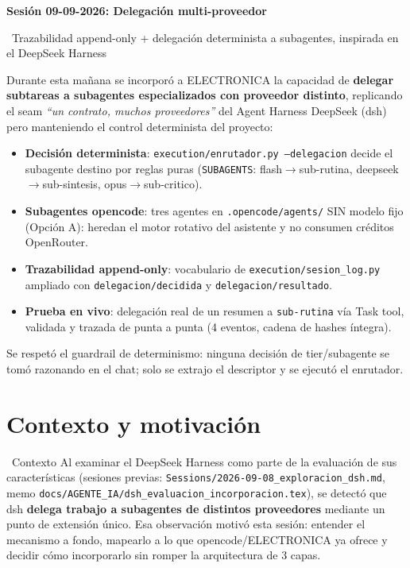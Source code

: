 \documentclass[11pt,a4paper]{article}
\newcommand{\iconoBanda}{microchip}
\newcommand{\bandaTitulo}[3][fondoOscuro]{%
  \begin{tcolorbox}[
    enhanced,
    colback=#1, colframe=#1,
    boxrule=0pt, arc=8pt, outer arc=8pt,
    width=\linewidth,
    top=18pt, bottom=6pt, left=14pt, right=14pt,
    borderline south={3.5pt}{0pt}{cyanNeon},
  ]
    \begin{minipage}[c]{0.07\linewidth}
      \centering
      \textcolor{cyanNeon}{\fontsize{30}{30}\selectfont\faIcon{\iconoBanda}}
    \end{minipage}%
    \hspace{8pt}%
    \begin{minipage}[c]{0.88\linewidth}
      {\fontsize{20}{24}\selectfont\bfseries\color{white}#2}\par\vspace{5pt}%
      \textcolor{cyanNeon!80!white}{\small\faIcon{angle-right}~#3}%
    \end{minipage}
    \vspace{4pt}
  \end{tcolorbox}%
  \vspace{8pt}%
}
\newcommand{\iconotexto}[2]{\textcolor{cyanNeon}{\faIcon{#1}}~#2}
\begin{document}
\bandaTitulo[fondoOscuro]{Sesión 09-09-2026: Delegación multi-proveedor}{Trazabilidad append-only + delegación determinista a subagentes, inspirada en el DeepSeek Harness}

\begin{tcolorbox}[tarjetaDato, title={\faIcon{clipboard-list}~Resumen ejecutivo}]
Durante esta mañana se incorporó a ELECTRONICA la capacidad de \textbf{delegar
subtareas a subagentes especializados con proveedor distinto}, replicando el seam
\emph{``un contrato, muchos proveedores''} del Agent Harness DeepSeek (dsh) pero
manteniendo el control determinista del proyecto:
\begin{itemize}[leftmargin=16pt, itemsep=2pt, topsep=2pt]
  \item \textbf{Decisión determinista}: \texttt{execution/enrutador.py --delegacion} decide el subagente destino por reglas puras (\texttt{SUBAGENTS}: flash$\rightarrow$sub-rutina, deepseek$\rightarrow$sub-sintesis, opus$\rightarrow$sub-critico).
  \item \textbf{Subagentes opencode}: tres agentes en \texttt{.opencode/agents/} SIN modelo fijo
        (Opción A): heredan el motor rotativo del asistente y no consumen créditos OpenRouter.
  \item \textbf{Trazabilidad append-only}: vocabulario de \texttt{execution/sesion\_log.py}
        ampliado con \texttt{delegacion/decidida} y \texttt{delegacion/resultado}.
  \item \textbf{Prueba en vivo}: delegación real de un resumen a \texttt{sub-rutina} vía Task
        tool, validada y trazada de punta a punta (4 eventos, cadena de hashes íntegra).
\end{itemize}
Se respetó el guardrail de determinismo: ninguna decisión de tier/subagente se tomó
razonando en el chat; solo se extrajo el descriptor y se ejecutó el enrutador.
\end{tcolorbox}

\section{Contexto y motivación}

\iconotexto{eye}{Contexto} Al examinar el DeepSeek Harness como parte de la evaluación
de sus características (sesiones previas: \texttt{Sessions/2026-09-08\_exploracion\_dsh.md},
memo \texttt{docs/AGENTE\_IA/dsh\_evaluacion\_incorporacion.tex}), se detectó que dsh
\textbf{delega trabajo a subagentes de distintos proveedores} mediante un punto de
extensión único. Esa observación motivó esta sesión: entender el mecanismo a fondo,
mapearlo a lo que opencode/ELECTRONICA ya ofrece y decidir cómo incorporarlo sin romper
la arquitectura de 3 capas.
\end{document}
